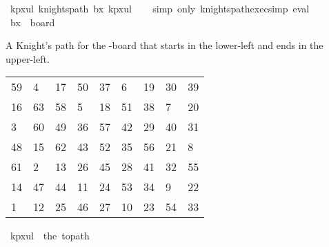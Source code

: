 \begin{isabellebody}
\isamarkupfalse%
\ kp{\isacharunderscore}{\kern0pt}{}x{}{\isacharunderscore}{\kern0pt}ul{\isacharcolon}{\kern0pt}\ {\isachardoublequoteopen}knights{\isacharunderscore}{\kern0pt}path\ b{}x{}\ kp{}x{}ul{\isachardoublequoteclose}\isanewline
%
\isadelimproof
\ \ %
\endisadelimproof
%
\isatagproof
{}\isamarkupfalse%
\ {\isacharparenleft}{\kern0pt}simp\ only{\isacharcolon}{\kern0pt}\ knights{\isacharunderscore}{\kern0pt}path{\isacharunderscore}{\kern0pt}exec{\isacharunderscore}{\kern0pt}simp{\isacharparenright}{\kern0pt}\ eval%
\endisatagproof
{\isafoldproof}%
%
\isadelimproof
\isanewline
%
\endisadelimproof
\isanewline
{}\isamarkupfalse%
\ {\isachardoublequoteopen}b{}x{}\ {\isasymequiv}\ board\ {}\ {}{\isachardoublequoteclose}%
\begin{isamarkuptext}%
A Knight's path for the -board that starts in the lower-left and ends in the 
upper-left.
  \begin{table}[H]
    \begin{tabular}{lllllllll}
      59 &  4 & 17 & 50 & 37 &  6 & 19 & 30 & 39 \\
      16 & 63 & 58 &  5 & 18 & 51 & 38 &  7 & 20 \\
       3 & 60 & 49 & 36 & 57 & 42 & 29 & 40 & 31 \\
      48 & 15 & 62 & 43 & 52 & 35 & 56 & 21 &  8 \\
      61 &  2 & 13 & 26 & 45 & 28 & 41 & 32 & 55 \\
      14 & 47 & 44 & 11 & 24 & 53 & 34 &  9 & 22 \\
       1 & 12 & 25 & 46 & 27 & 10 & 23 & 54 & 33
    \end{tabular}
  \end{table}%
\end{isamarkuptext}\isamarkuptrue%
\isamarkupfalse%
\ {\isachardoublequoteopen}kp{}x{}ul\ {\isasymequiv}\ the\ {\isacharparenleft}{\kern0pt}to{\isacharunderscore}{\kern0pt}path\ \isanewline
\ \ {\isacharbrackleft}{\kern0pt}{\isacharbrackleft}{\kern0pt}{}{}{\isacharcomma}{\kern0pt}{}{\isacharcomma}{\kern0pt}{}{}{\isacharcomma}{\kern0pt}{}{}{\isacharcomma}{\kern0pt}{}{}{\isacharcomma}{\kern0pt}{}{\isacharcomma}{\kern0pt}{}{}{\isacharcomma}{\kern0pt}{}{}{\isacharcomma}{\kern0pt}{}{}{\isacharbrackright}{\kern0pt}{\isacharcomma}{\kern0pt}\isanewline

\end{isabellebody}
